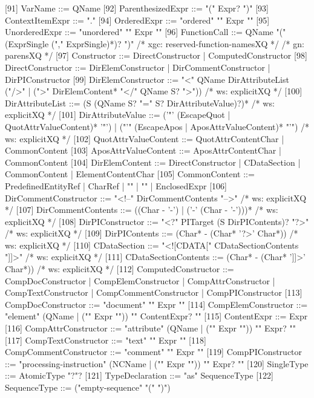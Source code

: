 [91]   	VarName	   ::=   	QName
[92]   	ParenthesizedExpr	   ::=   	"(" Expr? ")"
[93]   	ContextItemExpr	   ::=   	"."
[94]   	OrderedExpr	   ::=   	"ordered" "{" Expr "}"
[95]   	UnorderedExpr	   ::=   	"unordered" "{" Expr "}"
[96]   	FunctionCall	   ::=   	QName "(" (ExprSingle ("," ExprSingle)*)? ")"	/* xgc: reserved-function-namesXQ */
				/* gn: parensXQ */
[97]   	Constructor	   ::=   	DirectConstructor
| ComputedConstructor
[98]   	DirectConstructor	   ::=   	DirElemConstructor
| DirCommentConstructor
| DirPIConstructor
[99]   	DirElemConstructor	   ::=   	"<" QName DirAttributeList ("/>" | (">" DirElemContent* "</" QName S? ">"))	/* ws: explicitXQ */
[100]   	DirAttributeList	   ::=   	(S (QName S? "=" S? DirAttributeValue)?)*	/* ws: explicitXQ */
[101]   	DirAttributeValue	   ::=   	('"' (EscapeQuot | QuotAttrValueContent)* '"')
| ("'" (EscapeApos | AposAttrValueContent)* "'")	/* ws: explicitXQ */
[102]   	QuotAttrValueContent	   ::=   	QuotAttrContentChar
| CommonContent
[103]   	AposAttrValueContent	   ::=   	AposAttrContentChar
| CommonContent
[104]   	DirElemContent	   ::=   	DirectConstructor
| CDataSection
| CommonContent
| ElementContentChar
[105]   	CommonContent	   ::=   	PredefinedEntityRef | CharRef | "{{" | "}}" | EnclosedExpr
[106]   	DirCommentConstructor	   ::=   	"<!--" DirCommentContents "-->"	/* ws: explicitXQ */
[107]   	DirCommentContents	   ::=   	((Char - '-') | ('-' (Char - '-')))*	/* ws: explicitXQ */
[108]   	DirPIConstructor	   ::=   	"<?" PITarget (S DirPIContents)? "?>"	/* ws: explicitXQ */
[109]   	DirPIContents	   ::=   	(Char* - (Char* '?>' Char*))	/* ws: explicitXQ */
[110]   	CDataSection	   ::=   	"<![CDATA[" CDataSectionContents "]]>"	/* ws: explicitXQ */
[111]   	CDataSectionContents	   ::=   	(Char* - (Char* ']]>' Char*))	/* ws: explicitXQ */
[112]   	ComputedConstructor	   ::=   	CompDocConstructor
| CompElemConstructor
| CompAttrConstructor
| CompTextConstructor
| CompCommentConstructor
| CompPIConstructor
[113]   	CompDocConstructor	   ::=   	"document" "{" Expr "}"
[114]   	CompElemConstructor	   ::=   	"element" (QName | ("{" Expr "}")) "{" ContentExpr? "}"
[115]   	ContentExpr	   ::=   	Expr
[116]   	CompAttrConstructor	   ::=   	"attribute" (QName | ("{" Expr "}")) "{" Expr? "}"
[117]   	CompTextConstructor	   ::=   	"text" "{" Expr "}"
[118]   	CompCommentConstructor	   ::=   	"comment" "{" Expr "}"
[119]   	CompPIConstructor	   ::=   	"processing-instruction" (NCName | ("{" Expr "}")) "{" Expr? "}"
[120]   	SingleType	   ::=   	AtomicType "?"?
[121]   	TypeDeclaration	   ::=   	"as" SequenceType
[122]   	SequenceType	   ::=   	("empty-sequence" "(" ")")
